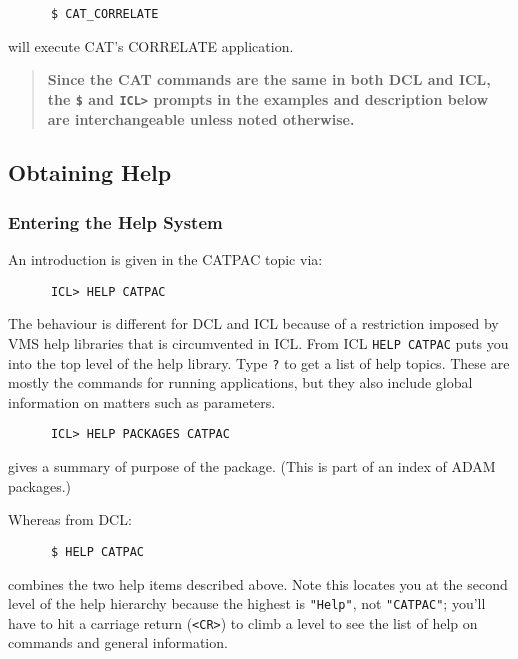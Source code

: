 \begin{verbatim}
      $ CAT_CORRELATE
\end{verbatim}

will execute {\small CAT}'s CORRELATE application.

\begin{quote}
{\large {\bf Since the {\normalsize{\bf CAT}} commands are the same in both
{\normalsize{\bf DCL}} and {\normalsize{\bf ICL}}, the {\tt \$} and {\tt ICL>}
prompts in the examples and description below are interchangeable unless noted
otherwise.}}
\end{quote}

\subsection{Obtaining Help}

\subsubsection{Entering the Help System}

An introduction is given in the CATPAC topic via:

\begin{verbatim}
      ICL> HELP CATPAC
\end{verbatim}

The behaviour is different for {\small DCL} and {\small ICL} because of a
restriction imposed by VMS help libraries that is circumvented in {\small ICL}. 
From {\small ICL} {\tt HELP CATPAC} puts you into the top level of the help
library. Type {\tt ?} to get a list of  help topics.  These are mostly the
commands for running applications, but they also include global information on
matters such as parameters.

\begin{verbatim}
      ICL> HELP PACKAGES CATPAC
\end{verbatim}

gives a summary of purpose of the package. (This is part of an index
of {\small ADAM} packages.)

Whereas from {\small DCL}:

\begin{verbatim}
      $ HELP CATPAC
\end{verbatim}

combines the two help items described above.  Note this locates you at the
second level of the help hierarchy because the highest is {\tt "Help"}, not
{\tt "CATPAC"}; you'll have to hit a carriage return ({\tt <CR>}) to climb a
level to see the list of help on commands and general information. 

